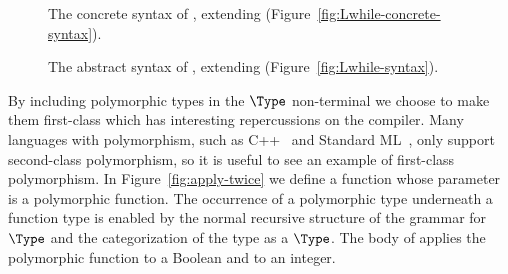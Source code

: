 \documentclass[7x10]{TimesAPriori_MIT}%
\newcommand{\gray}[1]{{\color{gray} #1}}
\begin{document}
\begin{figure}[tp]
\centering
\fbox{
  \begin{minipage}{0.96\textwidth}
\small
\[
\begin{array}{lcl}
  \Type &::=& \ldots \MID \LP\key{All}~\LP\Var\ldots\RP~ \Type\RP \MID \Var \\
  \Def &::=& \gray{ \CDEF{\Var}{\LS\Var \key{:} \Type\RS \ldots}{\Type}{\Exp} } \\
   &\MID& \LP\key{:}~\Var~\Type\RP \\
   &&       \LP\key{define}~ \LP\Var ~ \Var\ldots\RP ~ \Exp\RP  \\
  \LangPoly{} &::=& \gray{ \Def \ldots ~ \Exp }
\end{array}
\]
\end{minipage}
}
\caption{The concrete syntax of \LangPoly{}, extending \LangLoop{}
    (Figure~\ref{fig:Lwhile-concrete-syntax}).}
\label{fig:Rpoly-concrete-syntax}
\end{figure}

\begin{figure}[tp]
\centering
\fbox{
  \begin{minipage}{0.96\textwidth}
\small
\[
\begin{array}{lcl}
  \Type &::=& \ldots \MID \LP\key{All}~\LP\Var\ldots\RP~ \Type\RP \MID \Var \\
  \Def &::=& \gray{ \DEF{\Var}{\LP\LS\Var \key{:} \Type\RS \ldots\RP}{\Type}{\code{'()}}{\Exp} } \\
   &\MID& \DECL{\Var}{\Type} \\
   &&  \DEF{\Var}{\LP\Var \ldots\RP}{\key{'Any}}{\code{'()}}{\Exp}  \\
  \LangPoly{} &::=& \gray{ \PROGRAMDEFSEXP{\code{'()}}{\LP\Def\ldots\RP}{\Exp} }
\end{array}
\]
\end{minipage}
}
\caption{The abstract syntax of \LangPoly{}, extending \LangLoop{}
    (Figure~\ref{fig:Lwhile-syntax}).}
\label{fig:Rpoly-syntax}
\end{figure}

By including polymorphic types in the $\Type$ non-terminal we choose
to make them first-class which has interesting repercussions on the
compiler. Many languages with polymorphism, such as
C++~\citep{stroustrup88:_param_types} and Standard
ML~\citep{Milner:1990fk}, only support second-class polymorphism, so
it is useful to see an example of first-class polymorphism. In
Figure~\ref{fig:apply-twice} we define a function 
whose parameter is a polymorphic function. The occurrence of a
polymorphic type underneath a function type is enabled by the normal
recursive structure of the grammar for $\Type$ and the categorization
of the  type as a $\Type$.  The body of 
applies the polymorphic function to a Boolean and to an integer.
\end{document}
